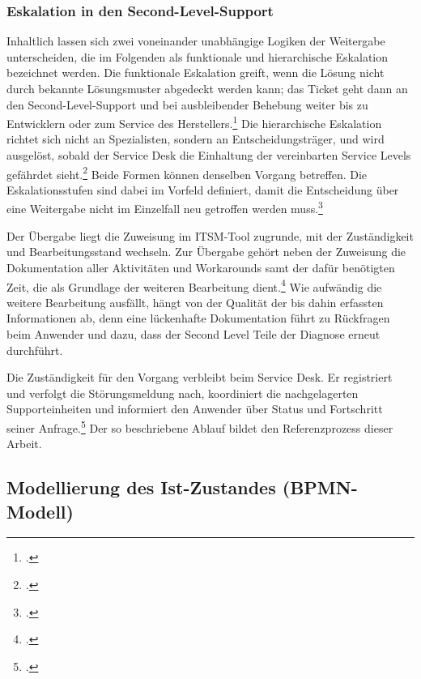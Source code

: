 \subsubsection{Eskalation in den Second-Level-Support}
\label{eskalationIst}

Inhaltlich lassen sich zwei voneinander unabh\"angige Logiken der Weitergabe unterscheiden, die im Folgenden als funktionale und hierarchische Eskalation bezeichnet werden. Die funktionale Eskalation greift, wenn die L\"osung nicht durch bekannte L\"osungsmuster abgedeckt werden kann; das Ticket geht dann an den Second-Level-Support und bei ausbleibender Behebung weiter bis zu Entwicklern oder zum Service des Herstellers.\footcite[Vgl.][S.~448]{Tiemeyer2020} Die hierarchische Eskalation richtet sich nicht an Spezialisten, sondern an Entscheidungstr\"ager, und wird ausgel\"ost, sobald der Service Desk die Einhaltung der vereinbarten Service Levels gef\"ahrdet sieht.\footcite[Vgl.][S.~450 und 484]{Tiemeyer2020} Beide Formen k\"onnen denselben Vorgang betreffen. Die Eskalationsstufen sind dabei im Vorfeld definiert, damit die Entscheidung \"uber eine Weitergabe nicht im Einzelfall neu getroffen werden muss.\footcite[Vgl.][S.~484]{Tiemeyer2020}

Der \"Ubergabe liegt die Zuweisung im ITSM-Tool zugrunde, mit der Zust\"andigkeit und Bearbeitungsstand wechseln. Zur \"Ubergabe geh\"ort neben der Zuweisung die Dokumentation aller Aktivit\"aten und Workarounds samt der daf\"ur ben\"otigten Zeit, die als Grundlage der weiteren Bearbeitung dient.\footcite[Vgl.][S.~448]{Tiemeyer2020} Wie aufw\"andig die weitere Bearbeitung ausf\"allt, h\"angt von der Qualit\"at der bis dahin erfassten Informationen ab, denn eine l\"uckenhafte Dokumentation f\"uhrt zu R\"uckfragen beim Anwender und dazu, dass der Second Level Teile der Diagnose erneut durchf\"uhrt.

Die Zust\"andigkeit f\"ur den Vorgang verbleibt beim Service Desk. Er registriert und verfolgt die St\"orungsmeldung nach, koordiniert die nachgelagerten Supporteinheiten und informiert den Anwender \"uber Status und Fortschritt seiner Anfrage.\footcite[Vgl.][S.~450]{Tiemeyer2020} Der so beschriebene Ablauf bildet den Referenzprozess dieser Arbeit.

\subsection{Modellierung des Ist-Zustandes (BPMN-Modell)}
\label{istModell}

